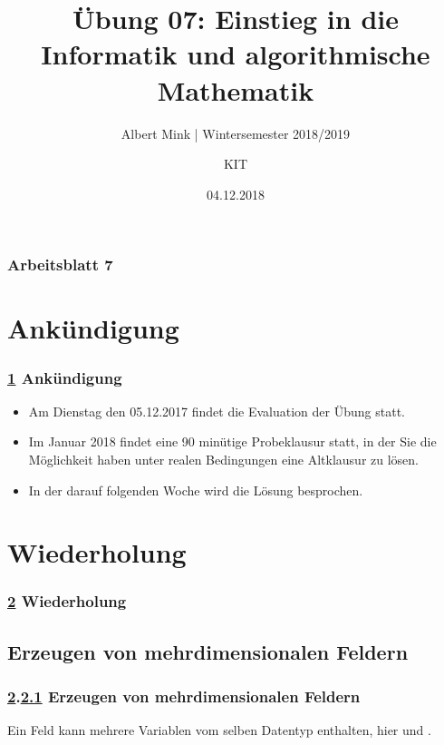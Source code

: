 \documentclass[c,18pt]{beamer}
\date{04.12.2018}
\title[Übung 07: Einstieg in die Informatik und algorithmische Mathematik]
  {Übung 07: Einstieg in die Informatik und algorithmische Mathematik}
\subtitle{Albert Mink | Wintersemester 2018/2019}
\author[Albert Mink, ]{KIT}
\institute[Institut für Angewandte und Numerische Mathematik (IANM)]{Institut für Angewandte und Numerische Mathematik}
\begin{document}
\begin{frame}
  \maketitle
\end{frame}

\begin{frame}
  \frametitle{Arbeitsblatt 7}%
\tableofcontents
\end{frame}

\def\kap{0}
\section{Ank\"undigung}\label{K:ank}
\begin{frame}
  \frametitle{\ref{K:ank} Ank\"undigung}%

\begin{itemize}
\item Am Dienstag den 05.12.2017 findet die Evaluation der \"Ubung statt.
\item Im Januar 2018 findet eine 90 min\"utige Probeklausur statt, in der Sie die M\"oglichkeit haben unter realen Bedingungen eine Altklausur zu l\"osen.
\item In der darauf folgenden Woche wird die L\"osung besprochen.
\end{itemize}

\end{frame}


\def\kap{1}
\section{Wiederholung}\label{K:wdh}
\begin{frame}
  \frametitle{\ref{K:wdh} Wiederholung}%
\tableofcontents[current]
\end{frame}

\def\stitle{Erzeugen von mehrdimensionalen Feldern}
\subsection{\stitle}\label{S:Erzeugen}
\begin{frame}[t]%
  \frametitle{\ref{K:wdh}.\ref{S:Erzeugen} \stitle}
\medskip

Ein Feld kann mehrere Variablen vom selben Datentyp enthalten, hier  und .


\end{frame}
\end{document}
